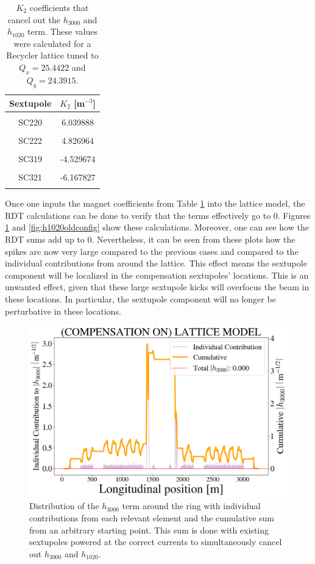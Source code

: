 \begin{table}[H]
    \centering
    \caption{$K_2$ coefficients that cancel out the $h_{3000}$ and $h_{1020}$ term. These values were calculated for a Recycler lattice tuned to $Q_x=25.4422$ and $Q_y=24.3915$.}
    \label{tab:k2sboth}
    \begin{tabular}{cc}
    \toprule
    \textbf{Sextupole} & $K_2$ [m$^{-3}$] \\ \midrule
     &  \\
    SC220 & 6.039888 \\
     &  \\
    SC222 & 4.826964 \\
     &  \\
    SC319 & -4.529674 \\
     &  \\
    SC321 & -6.167827 \\
     &  \\ \hline
    \end{tabular}
    \end{table}

Once one inputs the magnet coefficients from Table \ref{tab:k2sboth}  into the lattice model, the RDT calculations can be done to verify that the terms effectively go to 0. Figures \ref{fig:h3000oldconfig} and \ref{fig:h1020oldconfig} show these calculations. Moreover, one can see how the RDT sums add up to 0. Nevertheless, it can be seen from these plots how the spikes are now very large compared to the previous cases and compared to the individual contributions from around the lattice. This effect means the sextupole component will be localized in the compensation sextupoles' locations. This is an unwanted effect, given that these large sextupole kicks will overfocus the beam in these locations. In particular, the sextupole component will no longer be perturbative in these locations. 

\begin{figure}[H]
    \centering
    \includegraphics[width=\columnwidth]{chapter4/old_config_h3000.png}
    \caption{Distribution of the $h_{3000}$ term around the ring with individual contributions from each relevant element and the cumulative sum from an arbitrary starting point. This sum is done with existing sextupoles powered at the correct currents to simultaneously cancel out $h_{3000}$ and $h_{1020}$.}
    \label{fig:h3000oldconfig}
\end{figure}

